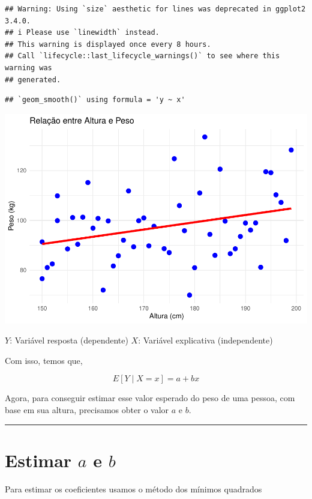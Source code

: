 \documentclass[
]{book}
\begin{document}
\begin{verbatim}
## Warning: Using `size` aesthetic for lines was deprecated in ggplot2 3.4.0.
## i Please use `linewidth` instead.
## This warning is displayed once every 8 hours.
## Call `lifecycle::last_lifecycle_warnings()` to see where this warning was
## generated.
\end{verbatim}

\begin{verbatim}
## `geom_smooth()` using formula = 'y ~ x'
\end{verbatim}

\begin{center}\includegraphics{AED_files/figure-latex/graf_regrecao-1} \end{center}

\(Y\): Variável resposta (dependente)
\(X\): Variável explicativa (independente)

Com isso, temos que,

\[
E[Y \mid X = x] = a + bx
\]

Agora, para conseguir estimar esse valor esperado do peso de uma pessoa, com base em sua altura, precisamos obter o valor \(a\) e \(b\).

\begin{center}\rule{0.5\linewidth}{0.5pt}\end{center}

\section{\texorpdfstring{Estimar \(a\) e \(b\)}{Estimar a e b}}\label{estimar-a-e-b}

Para estimar os coeficientes usamos o método dos mínimos quadrados
\end{document}

